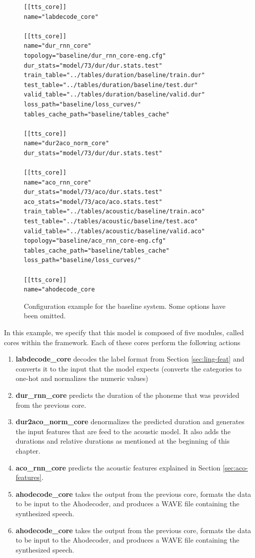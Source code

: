 \begin{figure}[h]
    \begin{lstlisting}[basicstyle=\small,frame=single]
[[tts_core]]                                       
name="labdecode_core"

[[tts_core]]                                       
name="dur_rnn_core"                                
topology="baseline/dur_rnn_core-eng.cfg"           
dur_stats="model/73/dur/dur.stats.test"            
train_table="../tables/duration/baseline/train.dur"
test_table="../tables/duration/baseline/test.dur"  
valid_table="../tables/duration/baseline/valid.dur"
loss_path="baseline/loss_curves/"                  
tables_cache_path="baseline/tables_cache"          
                                                   
[[tts_core]]                                       
name="dur2aco_norm_core"                           
dur_stats="model/73/dur/dur.stats.test"

[[tts_core]]
name="aco_rnn_core"
dur_stats="model/73/aco/dur.stats.test"
aco_stats="model/73/aco/aco.stats.test"
train_table="../tables/acoustic/baseline/train.aco"
test_table="../tables/acoustic/baseline/test.aco"
valid_table="../tables/acoustic/baseline/valid.aco"
topology="baseline/aco_rnn_core-eng.cfg"
tables_cache_path="baseline/tables_cache"
loss_path="baseline/loss_curves/"

[[tts_core]]
name="ahodecode_core
    \end{lstlisting}
    \label{fig:soc-conf}
    \caption{Configuration example for the baseline system. Some options have been omitted.}
\end{figure}

In this example, we specify that this model is composed of five modules, called cores within the framework. Each of these cores perform the following actions

\begin{enumerate}
    \item \textbf{labdecode\_core} decodes the label format from Section \ref{sec:ling-feat} and converts it to the input that the model expects (converts the categories to one-hot and normalizes the numeric values)
    \item \textbf{dur\_rnn\_core} predicts the duration of the phoneme that was provided from the previous core.
    \item \textbf{dur2aco\_norm\_core} denormalizes the predicted duration and generates the input features that are feed to the acoustic model. It also adds the durations and relative durations as mentioned at the beginning of this chapter.
    \item \textbf{aco\_rnn\_core} predicts the acoustic features explained in Section \ref{sec:aco-features}.
    \item \textbf{ahodecode\_core} takes the output from the previous core, formats the data to be input to the Ahodecoder, and produces a WAVE file containing the synthesized speech.
    \item \textbf{ahodecode\_core} takes the output from the previous core, formats the data to be input to the Ahodecoder, and produces a WAVE file containing the synthesized speech.
\end{enumerate}

